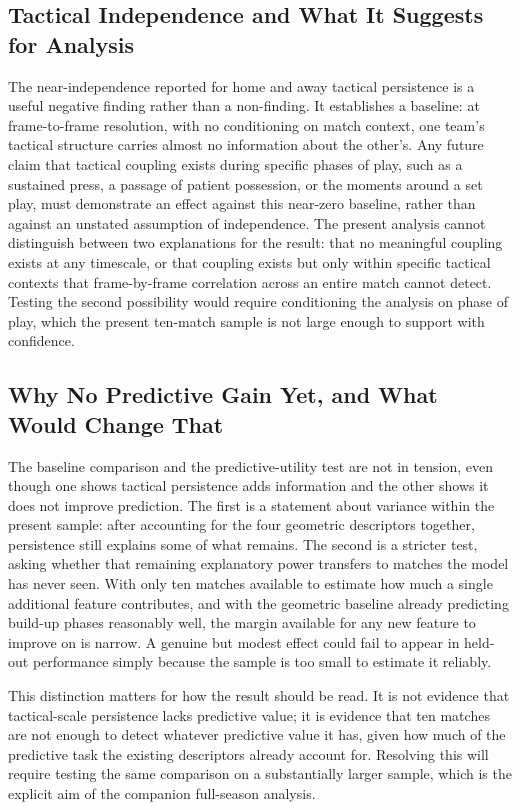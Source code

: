\subsection{Tactical Independence and What It Suggests for Analysis}

The near-independence reported for home and away tactical persistence
is a useful negative finding rather than a non-finding. It establishes
a baseline: at frame-to-frame resolution, with no conditioning on match
context, one team's tactical structure carries almost no information
about the other's. Any future claim that tactical coupling exists
during specific phases of play, such as a sustained press, a passage of patient possession, or the moments around a set play, must demonstrate
an effect against this near-zero baseline, rather than against an
unstated assumption of independence. The present analysis cannot
distinguish between two explanations for the result: that no
meaningful coupling exists at any timescale, or that coupling exists
but only within specific tactical contexts that frame-by-frame
correlation across an entire match cannot detect. Testing the second
possibility would require conditioning the analysis on phase of play,
which the present ten-match sample is not large enough to support with
confidence.

\subsection{Why No Predictive Gain Yet, and What Would Change That}

The baseline comparison and the predictive-utility test are not in
tension, even though one shows tactical persistence adds information
and the other shows it does not improve prediction. The first is a
statement about variance within the present sample: after accounting
for the four geometric descriptors together, persistence still
explains some of what remains. The second is a stricter test, asking
whether that remaining explanatory power transfers to matches the model
has never seen. With only ten matches available to estimate how much a
single additional feature contributes, and with the geometric baseline
already predicting build-up phases reasonably well, the margin
available for any new feature to improve on is narrow. A genuine but
modest effect could fail to appear in held-out performance simply
because the sample is too small to estimate it reliably.

This distinction matters for how the result should be read. It is not
evidence that tactical-scale persistence lacks predictive value; it is
evidence that ten matches are not enough to detect whatever predictive
value it has, given how much of the predictive task the existing
descriptors already account for. Resolving this will require testing
the same comparison on a substantially larger sample, which is the
explicit aim of the companion full-season analysis.

